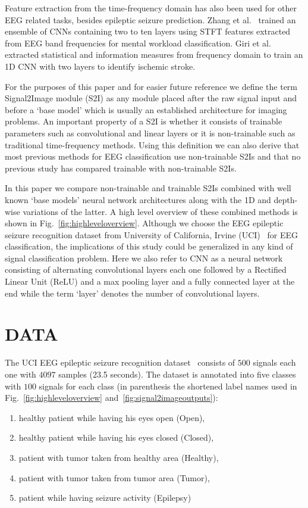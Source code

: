\documentclass[conference]{IEEEtran}
\begin{document}
Feature extraction from the time-frequency domain has also been used for other EEG related tasks, besides epileptic seizure prediction.
Zhang et al.~\cite{zhang2017pattern} trained an ensemble of CNNs containing two to ten layers using STFT features extracted from EEG band frequencies for mental workload classification.
Giri et al.~\cite{giri2016ischemic} extracted statistical and information measures from frequency domain to train an 1D CNN with two layers to identify ischemic stroke.

For the purposes of this paper and for easier future reference we define the term Signal2Image module (S2I) as any module placed after the raw signal input and before a `base model' which is usually an established architecture for imaging problems.
An important property of a S2I is whether it consists of trainable parameters such as convolutional and linear layers or it is non-trainable such as traditional time-frequency methods.
Using this definition we can also derive that most previous methods for EEG classification use non-trainable S2Is and that no previous study has compared trainable with non-trainable S2Is.

In this paper we compare non-trainable and trainable S2Is combined with well known `base models' neural network architectures along with the 1D and depth-wise variations of the latter.
A high level overview of these combined methods is shown in Fig.~\ref{fig:highleveloverview}.
Although we choose the EEG epileptic seizure recognition dataset from University of California, Irvine (UCI)~\cite{andrzejak2001indications} for EEG classification, the implications of this study could be generalized in any kind of signal classification problem.
Here we also refer to CNN as a neural network consisting of alternating convolutional layers each one followed by a Rectified Linear Unit (ReLU) and a max pooling layer and a fully connected layer at the end while the term `layer' denotes the number of convolutional layers.

\section{DATA}
The UCI EEG epileptic seizure recognition dataset~\cite{andrzejak2001indications} consists of $500$ signals each one with $4097$ samples (23.5 seconds).
The dataset is annotated into five classes with $100$ signals for each class (in parenthesis the shortened label names used in Fig.~\ref{fig:highleveloverview} and~\ref{fig:signal2imageoutputs}):
\begin{enumerate}
	\item healthy patient while having his eyes open (Open),
	\item healthy patient while having his eyes closed (Closed),
	\item patient with tumor taken from healthy area (Healthy),
	\item patient with tumor taken from tumor area (Tumor),
	\item patient while having seizure activity (Epilepsy)
\end{enumerate}
\end{document}
